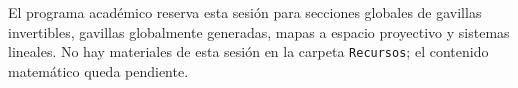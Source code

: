\begin{nota}
El programa académico reserva esta sesión para secciones globales de gavillas invertibles, gavillas globalmente generadas, mapas a espacio proyectivo y sistemas lineales. No hay materiales de esta sesión en la carpeta \texttt{Recursos}; el contenido matemático queda pendiente.
\end{nota}
